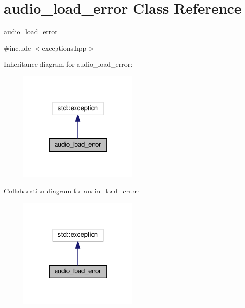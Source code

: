\hypertarget{classaudio__load__error}{}\section{audio\+\_\+load\+\_\+error Class Reference}
\label{classaudio__load__error}


\hyperlink{classaudio__load__error}{audio\+\_\+load\+\_\+error}  




{\ttfamily \#include $<$exceptions.\+hpp$>$}



Inheritance diagram for audio\+\_\+load\+\_\+error\+:\nopagebreak
\begin{figure}[H]
\begin{center}
\leavevmode
\includegraphics[width=168pt]{classaudio__load__error__inherit__graph}
\end{center}
\end{figure}


Collaboration diagram for audio\+\_\+load\+\_\+error\+:\nopagebreak
\begin{figure}[H]
\begin{center}
\leavevmode
\includegraphics[width=168pt]{classaudio__load__error__coll__graph}
\end{center}
\end{figure}
